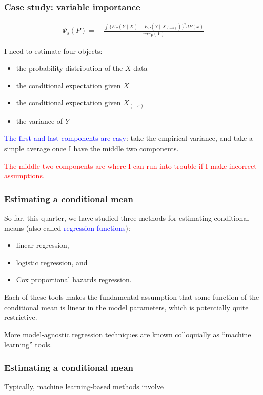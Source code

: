 \documentclass[12pt, 
hyperref={colorlinks=true, linkcolor=blue, urlcolor=cyan}]{beamer}
\begin{document}
\begin{frame}
\frametitle{Case study: variable importance}
\vspace{-1cm}
\begin{align*}
\Psi_s(P) = &\ \frac{\int \{E_P(Y \mid X) - E_P(Y \mid X_{(-s)})\}^2 dP(x)}{var_P(Y)}
\end{align*}

I need to estimate four objects:
\begin{itemize}
\item the probability distribution of the $X$ data
\item the conditional expectation given $X$
\item the conditional expectation given $X_{(-s)}$
\item the variance of $Y$
\end{itemize}

\textcolor{blue}{The first and last components are easy}: take the empirical variance, and take a simple average once I have the middle two components.

\textcolor{red}{The middle two components are where I can run into trouble if I make incorrect assumptions. }
\end{frame}

\begin{frame}
\frametitle{Estimating a conditional mean}
So far, this quarter, we have studied three methods for estimating conditional means (also called \textcolor{blue}{regression functions}):
\begin{itemize}
\item linear regression,
\item logistic regression, and
\item Cox proportional hazards regression.
\end{itemize}

Each of these tools makes the fundamental assumption that some function of the conditional mean is linear in the model parameters, which is potentially quite restrictive.

More model-agnostic regression techniques are known colloquially as ``machine learning'' tools.
\end{frame}

\begin{frame}
\frametitle{Estimating a conditional mean}
Typically, machine learning-based methods involve 

\end{frame}





\end{document}

